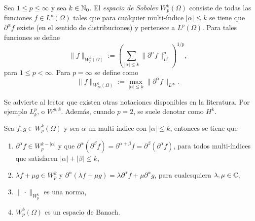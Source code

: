 \begin{definition}
	Sea $1\leq p \leq\infty$ y sea $k\in\mathbb{N}_0$. El \textit{espacio de Sobolev} $W^k_p(\Omega)$ consiste de todas las funciones $f\in L^p(\Omega)$ tales que para cualquier multi-índice $|\alpha|\leq k$ se tiene que $\partial^\alpha f$ existe (en el sentido de distribuciones) y pertenece a $L^p(\Omega)$. Para tales funciones se define 
	\begin{equation*}
		\|f\|_{W^k_p(\Omega)} := \left( \sum_{|\alpha|\leq k} \|\partial^\alpha f\|_{L^p}^p
		\right)^{1/p},
	\end{equation*}
	para $1\leq p <\infty$. Para $p=\infty$ se define como 
	\begin{equation*}
		\|f\|_{W^k_\infty(\Omega)} := \max_{|\alpha|\leq k} \|\partial^\alpha f\|_{L^\infty}.
	\end{equation*}
\end{definition}
\begin{remark}
	Se advierte al lector que existen otras notaciones disponibles en la literatura.  Por ejemplo $L^p_k$, o $W^{p,k}$. Además, cuando $p=2$, se suele denotar como $H^k$.
\end{remark}
\begin{theorem} 
	Sea $f, g \in W^k_p(\Omega)$ y sea $\alpha$ un multi-índice con $|\alpha|\leq k$, entonces se tiene que 
	\begin{enumerate}
		\item $\partial^\alpha f \in W^{k-|\alpha|}_p$ y que $\partial^{\alpha}(\partial^{\beta}f) = \partial^{\alpha+\beta} f = \partial^{\beta}(\partial^{\alpha}f)$, para todos multi-índices que satisfacen  $|\alpha|+|\beta| \leq k$,
		\item $\lambda f + \mu g \in W^k_p$ y $\partial^\alpha(\lambda f + \mu g) = \lambda\partial^\alpha f + \mu\partial^\alpha g$, para cualesquiera $\lambda, \mu\in \mathbb{C}$,
		\item $\|\cdot\|_{W^k_p}$ es una norma,
		\item $W^k_p(\Omega)$ es un espacio de Banach.
	\end{enumerate}  
\end{theorem}
